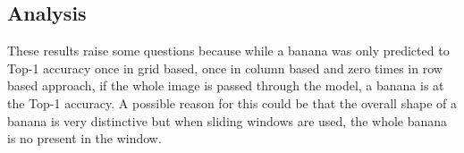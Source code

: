 \tocless\subsection{Analysis}
These results raise some questions because while a banana was only predicted to
Top-1 accuracy once in grid based, once in column based and zero times in row
based approach, if the whole image is passed through the model, a banana is at the Top-1 accuracy.
A possible reason for this could be that the overall shape of a banana is very distinctive but when sliding windows are used, the whole banana is no present in the window.

\afterpage{\clearpage}






















